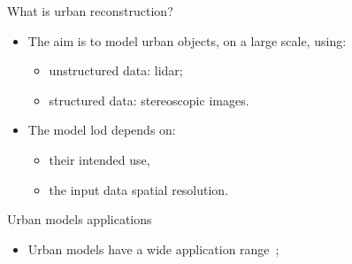 \documentclass{beamer}
\begin{document}
            \begin{frame}{What is urban reconstruction?}
                \begin{itemize}[label=$\blacktriangleright$, font=\color{IGNGreen}]
                    \item<1-> The aim is to model urban objects, on a large scale, using:
                    \begin{itemize}[label=--]
                        \item<2-> unstructured data: \gls{lidar};
                        \item<3-> structured data: stereoscopic images.
                    \end{itemize}
                    \item<3-> The model \gls{lod} depends on:
                    \begin{itemize}[label=--]
                        \item<4-> their intended use,
                        \item<5-> the input data spatial resolution.
                    \end{itemize}
                \end{itemize}
            \end{frame}

            \begin{frame}{Urban models applications}
                \begin{itemize}[label=$\blacktriangleright$, font=\color{IGNGreen}]
                    \item<1-> Urban models have a wide application range~;
                \end{itemize}
            \end{frame}
\end{document}
